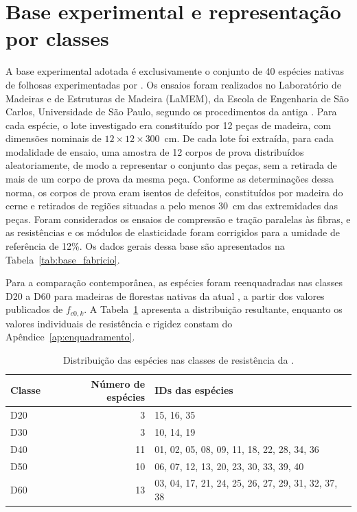 \section{Base experimental e representação por classes}\label{sec:materials}

A base experimental adotada é exclusivamente o conjunto de 40 espécies nativas de folhosas experimentadas por \textcite{DiasLahr2004}. Os ensaios foram realizados no Laboratório de Madeiras e de Estruturas de Madeira (LaMEM), da Escola de Engenharia de São Carlos, Universidade de São Paulo, segundo os procedimentos da antiga \textcite{NBR7190:1997}. Para cada espécie, o lote investigado era constituído por 12 peças de madeira, com dimensões nominais de $12\times12\times300$~cm. De cada lote foi extraída, para cada modalidade de ensaio, uma amostra de 12 corpos de prova distribuídos aleatoriamente, de modo a representar o conjunto das peças, sem a retirada de mais de um corpo de prova da mesma peça. Conforme as determinações dessa norma, os corpos de prova eram isentos de defeitos, constituídos por madeira do cerne e retirados de regiões situadas a pelo menos 30~cm das extremidades das peças. Foram considerados os ensaios de compressão e tração paralelas às fibras, e as resistências e os módulos de elasticidade foram corrigidos para a umidade de referência de 12\%. Os dados gerais dessa base são apresentados na Tabela~\ref{tab:base_fabricio}.

Para a comparação contemporânea, as espécies foram reenquadradas nas classes D20 a D60 para madeiras de florestas nativas da atual \textcite{NBR7190-1:2022}, a partir dos valores publicados de $f_{c0,k}$. A Tabela~\ref{tab:resumo_classes} apresenta a distribuição resultante, enquanto os valores individuais de resistência e rigidez constam do Apêndice~\ref{ap:enquadramento}.

\begin{table}[H]
\centering
\caption{Distribuição das espécies nas classes de resistência da \textcite{NBR7190-1:2022}.}\label{tab:resumo_classes}
\begin{tabular}{lrl}
\toprule
Classe & Número de espécies & IDs das espécies \\
\midrule
D20 & 3  & 15, 16, 35 \\
D30 & 3  & 10, 14, 19 \\
D40 & 11 & 01, 02, 05, 08, 09, 11, 18, 22, 28, 34, 36 \\
D50 & 10 & 06, 07, 12, 13, 20, 23, 30, 33, 39, 40 \\
D60 & 13 & 03, 04, 17, 21, 24, 25, 26, 27, 29, 31, 32, 37, 38 \\
\bottomrule
\end{tabular}
\end{table}


